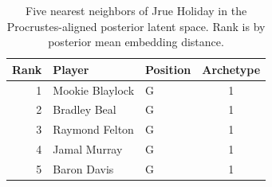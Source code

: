 \begin{table}[htbp]
  \centering\small
  \begin{tabular}{rllc}
    \toprule
    Rank & Player & Position & Archetype \\
    \midrule
    1 & Mookie Blaylock & G & 1 \\
    2 & Bradley Beal & G & 1 \\
    3 & Raymond Felton & G & 1 \\
    4 & Jamal Murray & G & 1 \\
    5 & Baron Davis & G & 1 \\
    \bottomrule
  \end{tabular}
  \caption{Five nearest neighbors of Jrue Holiday in the Procrustes-aligned posterior latent space. Rank is by posterior mean embedding distance.}
  \label{tab:Jrue_Holiday_neighbors}
\end{table}

